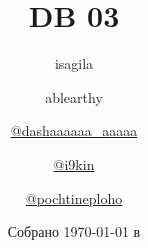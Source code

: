 \title{\huge \textbf{DB \LeC{} 03}}
\author{
  isagila
  \and
  ablearthy
  \and
  \href{https://t.me/dashaaaaaa_aaaaa}{@dashaaaaaa\_aaaaa}
  \and
  \href{https://t.me/i9kin}{@i9kin}
  \and
  \href{https://t.me/pochtineploho}{@pochtineploho}
}
\date{Собрано {\ddmmyyyydate\today} в \currenttime}
\newcommand{\githublink}{https://github.com/isagila/tesc}
